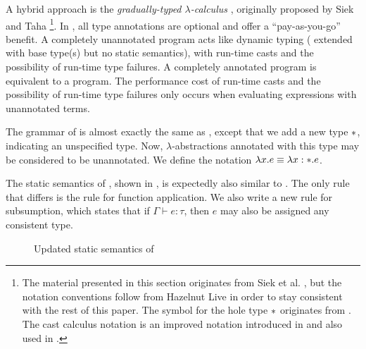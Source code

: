 A hybrid approach is the \textit{gradually-typed $\lambda$-calculus} \gtlc{}, originally proposed by Siek and Taha \cite{Siek06gradualtyping,siek2015refined}\footnote{The material presented in this section originates from Siek et al. \cite{Siek06gradualtyping,siek2015refined}, but the notation conventions follow from Hazelnut Live \cite{conf/popl/HazelnutLive19} in order to stay consistent with the rest of this paper. The symbol for the hole type $*{}$ originates from \cite{siek2015refined}. The cast calculus notation is an improved notation introduced in \cite{siek2015refined} and also used in \cite{conf/popl/HazelnutLive19}.}. In \gtlc{}, all type annotations are optional and offer a ``pay-as-you-go'' benefit. A completely unannotated \gtlc{} program acts like dynamic typing (\ulc{} extended with base type(s) but no static semantics), with run-time casts and the possibility of run-time type failures. A completely annotated \gtlc{} program is equivalent to a \stlc{} program. The performance cost of run-time casts and the possibility of run-time type failures only occurs when evaluating expressions with unannotated terms.

The grammar of \gtlc{} is almost exactly the same as \stlc, except that we add a new type $*$, indicating an unspecified type. Now, $\lambda$-abstractions annotated with this type may be considered to be unannotated. We define the notation $\lambda x.e\equiv\lambda x:*.e$.

The static semantics of \gtlc{}, shown in , is expectedly also similar to \stlc. The only rule that differs is the rule for function application. We also write a new rule for subsumption, which states that if $\Gamma\vdash e:\tau$, then $e$ may also be assigned any consistent type.

\begin{figure}
  \centering
  \begin{mdframed}
    \begin{singlespace}
    \end{singlespace}
  \end{mdframed}
  \caption{Updated static semantics of \gtlc}
  \label{fig:statics-gtlc}
\end{figure}

